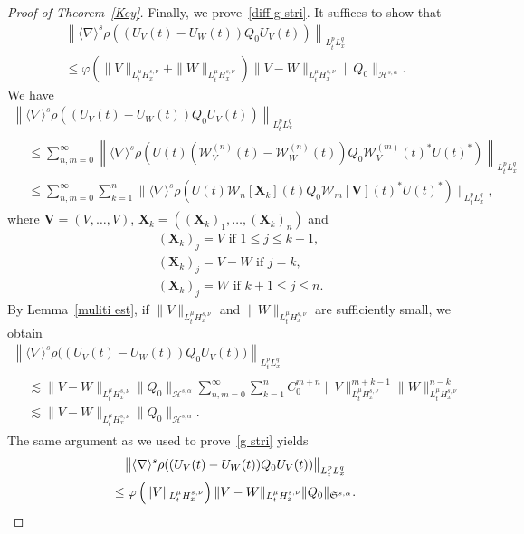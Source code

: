 \documentclass[AHL,Unicode,longabstracts,MathTools,published]{cedram}
\newcommand{\vV}{{\mathbf{V}}}
\newcommand{\vX}{{\mathbf{X}}}
\newcommand{\CH}{\mathcal{H}}
\newcommand{\CW}{\mathcal{W}}
\newcommand{\FS}{\mathfrak{S}}
\newcommand{\al}{\alpha}
\newcommand{\ph}{\varphi}
\newcommand{\rh}{\rho}
\newcommand{\K}[1]{\left(#1\right)}
\renewcommand{\No}[1]{\left\| #1 \right\|}
\newcommand{\I}{\infty}
\newcommand{\sd}{\langle \nabla \rangle}
\newcommand{\ls}{\lesssim}
\begin{document}
\begin{proof}[{Proof of Theorem~\ref{Key}}]
Finally, we prove~\eqref{diff g stri}. It suffices to show that
\begin{multline}
\left\|\sd^s \rh((U_V(t)-U_W(t)) Q_0 U_V(t))\right\|_{L^p_t L^q_x} \\
\le \ph\left(\|V\|_{L^\mu_t H^{s,\nu}_x} + \|W\|_{L^\mu_t H^{s,\nu}_x}\right)
\|V-W\|_{L^\mu_t H^{s,\nu}_x}
\|Q_0\|_{\CH^{s,\al}}.
\end{multline}
We have
\begin{multline}
\left\|\sd^s \rh\left((U_V(t)-U_W(t)) Q_0 U_V(t)\right)\right\|_{L^p_t L^q_x} \\
\begin{aligned}
&\le \sum_{n,m=0}^\I
\No{
\sd^s \rh\K{U(t)\left(\CW_V^{(n)}(t) - \CW_W^{(n)}(t)\right) Q_0 \CW^{(m)}_V(t)^* U(t)^*} }_{L^p_t L^q_x} \\
&\le \sum_{n,m=0}^\I \sum_{k=1}^n
\big\|
\sd^s \rh\K{U(t) \CW_n[\vX_k](t) Q_0 \CW_m[\vV](t)^* U(t)^*} \big\|_{L^p_t L^q_x},
\end{aligned}
\end{multline}
where $\vV= (V,\dots, V)$, $\vX_k=((\vX_k)_1, \dots, (\vX_k)_n)$ and
\begin{align}
&(\vX_k)_j = V \text{ if } 1 \le j \le k-1, \\
&(\vX_k)_j = V-W \text{ if } j = k, \\
&(\vX_k)_j = W \text{ if } k+1 \le j \le n.
\end{align}
By Lemma~\ref{muliti est}, if $\|V\|_{L^\mu_t H^{s,\nu}_x}$ and $\|W\|_{L^\mu_t H^{s,\nu}_x}$ are sufficiently small, we obtain
\begin{multline}
\left\|\sd^s \rh\big((U_V(t)-U_W(t)) Q_0 U_V(t)\big)\right\|_{L^p_t L^q_x} \\
\begin{aligned}
& \ls \|V-W\|_{L^\mu_t H^{s,\nu}_x}
\|Q_0\|_{\CH^{s,\al}}
\sum_{n,m=0}^\I \sum_{k=1}^n C_0^{m+n}
\|V\|_{L^\mu_t H^{s,\nu}_x}^{m+k-1}
\|W\|_{L^\mu_t H^{s,\nu}_x}^{n-k} \\
&\ls \|V-W\|_{L^\mu_t H^{s,\nu}_x} \|Q_0\|_{\CH^{s,\al}}.
\end{aligned}
\end{multline}
The same argument as we used to prove~\eqref{g stri} yields
\begin{multline}
\big\|\sd^s \rh((U_V(t)-U_W(t)) Q_0 U_V(t))\big\|_{L^p_t L^q_x}
\\
\le \ph\left(\|V\|_{L^\mu_t H^{s,\nu}_x}\right)
\|V-W\|_{L^\mu_t H^{s,\nu}_x}
\|Q_0\|_{\FS^{s,\al}}.\qedhere
\end{multline}
\end{proof}
\end{document}
